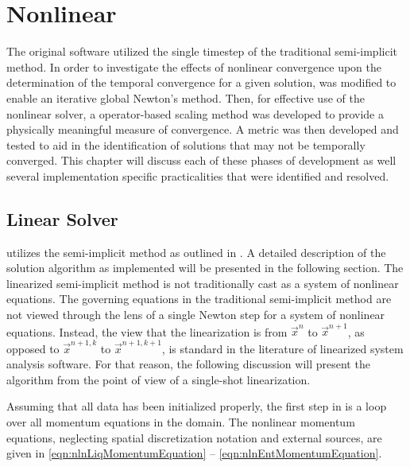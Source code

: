 \chapter{Nonlinear \cobra{}}
\label{chap:nln_solver}
The original \cobra{} software utilized the single timestep of the traditional semi-implicit method.
In order to investigate the effects of nonlinear convergence upon the determination of the temporal convergence for a given solution, \cobra{} was modified to enable an iterative global Newton's method.
Then, for effective use of the nonlinear solver, a operator-based scaling method was developed to provide a physically meaningful measure of convergence.
A metric was then developed and tested to aid in the identification of solutions that may not be temporally converged.
This chapter will discuss each of these phases of development as well several implementation specific practicalities that were identified and resolved.

\section{Linear Solver}
\label{sect:linCobraAlg}

\cobra{} utilizes the semi-implicit method as outlined in .
A detailed description of the solution algorithm as implemented will be presented in the following section.
The linearized semi-implicit method is not traditionally cast as a system of nonlinear equations.
The governing equations in the traditional semi-implicit method are not viewed through the lens of a single Newton step for a system of nonlinear equations.
Instead, the view that the linearization is from $\vec{x}^{n}$ to $\vec{x}^{n+1}$, as opposed to $\vec{x}^{n+1, k}$ to $\vec{x}^{n+1, k+1}$, is standard in the literature of linearized system analysis software.
For that reason, the following discussion will present the algorithm from the point of view of a single-shot linearization.

Assuming that all data has been initialized properly, the first step in \cobra{} is a loop over all momentum equations in the domain.
The nonlinear momentum equations, neglecting spatial discretization notation and external sources, are given in \eqref{eqn:nlnLiqMomentumEquation} -- \eqref{eqn:nlnEntMomentumEquation}.

